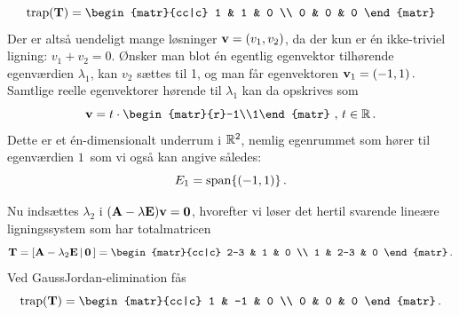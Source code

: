 \begin{example}
\begin{equation}
\mathrm{trap}(\mathbf T)=\begin{matr}{cc|c} 1 & 1 & 0 \\ 0 & 0 & 0 \end{matr}
\end{equation}
Der er altså uendeligt mange løsninger $ \mathbf{v} = (v_1, v_2) $, da der kun er én ikke-triviel ligning: $ v_1 + v_2 = 0 $. Ønsker man blot én egentlig egenvektor tilhørende egenværdien $ \lambda_1 $, kan $ v_2 $ sættes til 1, og man får egenvektoren $ \mathbf{v}_1 = (-1,1)\,. $ Samtlige reelle egenvektorer hørende til $ \lambda_1 $ kan da opskrives som
\begin{equation}
\mv=t\cdot \begin{matr}{r}-1\\1\end{matr}\,\,,\,t\in \reel\,.
\end{equation}
Dette er et én-dimensionalt underrum i $ \mathbb{R}^2 $, nemlig egenrummet som hører til egenværdien $1\,$ som vi også kan angive således:
\begin{equation}
E_1=\mathrm{span}\{(-1,1)\}\,.
\end{equation}

Nu indsættes $ \lambda_2 $ i $(\mathbf{A} - \lambda \mathbf{E}) \mathbf{v} = \bm{0} $, hvorefter vi løser det hertil svarende lineære ligningssystem som har totalmatricen
\begin{equation}
\mathbf T=\left[\mA - \lambda_2 \mE\,|\, \mnul\,\right]=\begin{matr}{cc|c} 2-3 & 1 & 0 \\ 1 & 2-3 & 0 \end{matr}\,.
\end{equation}
Ved GaussJordan-elimination fås
\begin{equation}
\mathrm{trap}(\mathbf T)=\begin{matr}{cc|c} 1 & -1 & 0 \\ 0 & 0 & 0 \end{matr}\,.
\end{equation}


\end{example}
